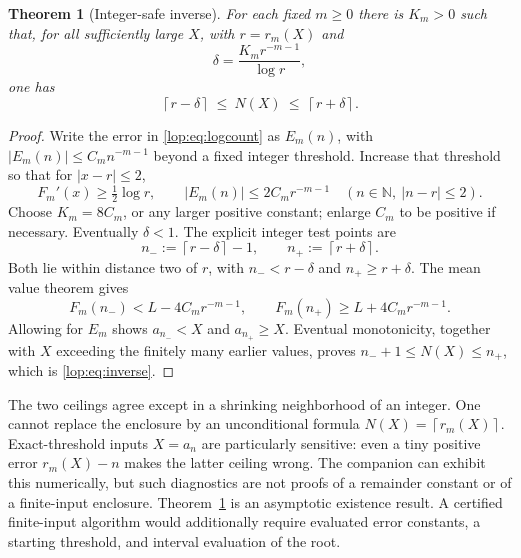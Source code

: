 \documentclass[11pt,letterpaper]{article}
\numberwithin{equation}{section}
\newtheorem{theorem}{Theorem}[section]
\theoremstyle{remark}\newtheorem{remark}[theorem]{Remark}
\newcommand{\NN}{\mathbb N}
\newcommand{\ceil}[1]{\left\lceil #1\right\rceil}
\begin{document}
\begin{theorem}[Integer-safe inverse]\label{lop:thm:inverse}
For each fixed $m\geq0$ there is $K_m>0$ such that, for all sufficiently
large $X$, with $r=r_m(X)$ and
\[
 \delta=\frac{K_m r^{-m-1}}{\log r},
\]
one has
\begin{equation}\label{lop:eq:inverse}
 \ceil{r-\delta}\ \leq\ N(X)\ \leq\ \ceil{r+\delta}.
\end{equation}
\end{theorem}
\begin{proof}
Write the error in \eqref{lop:eq:logcount} as $E_m(n)$, with
$|E_m(n)|\leq C_mn^{-m-1}$ beyond a fixed integer threshold. Increase
that threshold so that for $|x-r|\leq2$,
\[
 F_m'(x)\geq\tfrac12\log r,
 \qquad |E_m(n)|\leq2C_m r^{-m-1}\quad(n\in\NN,\ |n-r|\leq2).
\]
Choose $K_m=8C_m$, or any larger positive constant; enlarge $C_m$ to be
positive if necessary. Eventually $\delta<1$. The explicit integer test
points are
\[
 n_-:=\ceil{r-\delta}-1,\qquad n_+:=\ceil{r+\delta}.
\]
Both lie within distance two of $r$, with $n_-<r-\delta$ and
$n_+\geq r+\delta$. The mean value theorem gives
\[
 F_m(n_-)<L-4C_mr^{-m-1},\qquad
 F_m(n_+)\geq L+4C_mr^{-m-1}.
\]
Allowing for $E_m$ shows $a_{n_-}<X$ and $a_{n_+}\geq X$.
Eventual monotonicity, together with $X$ exceeding the finitely many
earlier values, proves $n_-+1\leq N(X)\leq n_+$, which is
\eqref{lop:eq:inverse}.
\end{proof}

The two ceilings agree except in a shrinking neighborhood of an integer.
One cannot replace the enclosure by an unconditional formula
$N(X)=\ceil{r_m(X)}$. Exact-threshold inputs $X=a_n$ are particularly
sensitive: even a tiny positive error $r_m(X)-n$ makes the latter ceiling
wrong. The companion can exhibit this numerically, but such diagnostics
are not proofs of a remainder constant or of a finite-input enclosure.
Theorem~\ref{lop:thm:inverse} is an asymptotic existence result. A certified
finite-input algorithm would additionally require evaluated error
constants, a starting threshold, and interval evaluation of the root.
\end{document}
